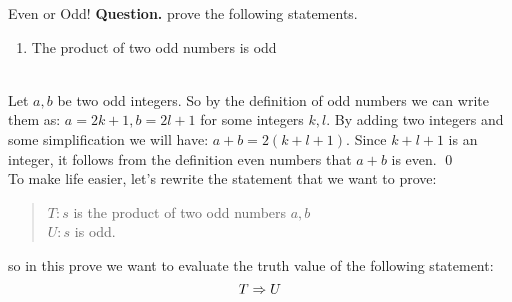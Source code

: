 \begin{example}{Even or Odd!}
	\textbf{Question.} prove the following statements.
	\begin{enumerate}
		\item The product of two odd numbers is odd
	\end{enumerate}

	 \\
	Let $ a,b $ be two odd integers. So by the definition of odd numbers we can write them as: $ a = 2k+1, b = 2l+1 $ for some integers $ k,l $. By adding two integers and some simplification we will have: $ a+b = 2(k+l+1) $. Since $ k+l+1 $ is an integer, it follows from the definition even numbers that $ a+b $ is even. \qed \\
	
	To make life easier, let's rewrite the statement that we want to prove:
	\begin{quote}
		\centering
		$ T: s $ is the product of two odd numbers $ a,b $ \\
		$ U: s $ is odd.
	\end{quote}
	so in this prove we want to evaluate the truth value of the following statement:
	\[ T \Rightarrow U \]
	

\end{example}
